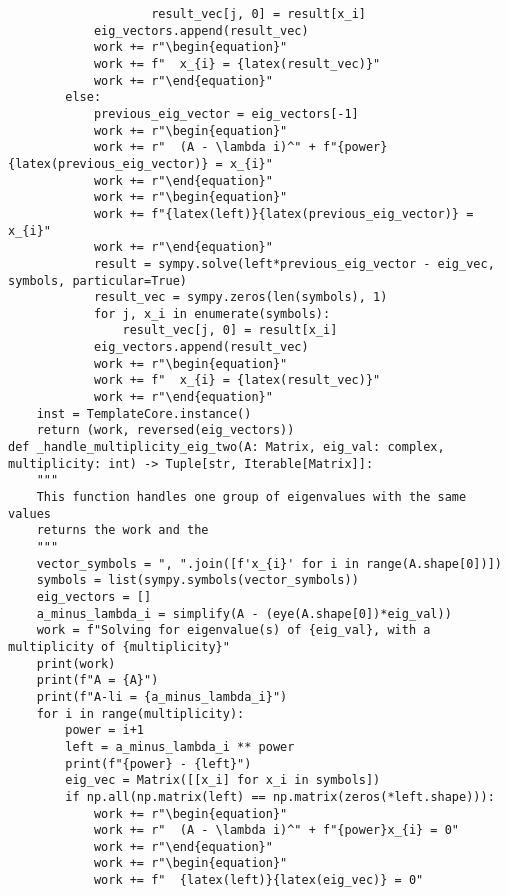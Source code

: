 \begin{verbatim}
                    result_vec[j, 0] = result[x_i]
            eig_vectors.append(result_vec)
            work += r"\begin{equation}"
            work += f"  x_{i} = {latex(result_vec)}"
            work += r"\end{equation}"
        else:
            previous_eig_vector = eig_vectors[-1]
            work += r"\begin{equation}"
            work += r"  (A - \lambda i)^" + f"{power}{latex(previous_eig_vector)} = x_{i}"
            work += r"\end{equation}"
            work += r"\begin{equation}"
            work += f"{latex(left)}{latex(previous_eig_vector)} = x_{i}"
            work += r"\end{equation}"
            result = sympy.solve(left*previous_eig_vector - eig_vec, symbols, particular=True)
            result_vec = sympy.zeros(len(symbols), 1)
            for j, x_i in enumerate(symbols):
                result_vec[j, 0] = result[x_i]
            eig_vectors.append(result_vec)
            work += r"\begin{equation}"
            work += f"  x_{i} = {latex(result_vec)}"
            work += r"\end{equation}"
    inst = TemplateCore.instance()
    return (work, reversed(eig_vectors))
def _handle_multiplicity_eig_two(A: Matrix, eig_val: complex, multiplicity: int) -> Tuple[str, Iterable[Matrix]]:
    """
    This function handles one group of eigenvalues with the same values
    returns the work and the 
    """
    vector_symbols = ", ".join([f'x_{i}' for i in range(A.shape[0])])
    symbols = list(sympy.symbols(vector_symbols))
    eig_vectors = []
    a_minus_lambda_i = simplify(A - (eye(A.shape[0])*eig_val))
    work = f"Solving for eigenvalue(s) of {eig_val}, with a multiplicity of {multiplicity}"
    print(work)
    print(f"A = {A}")
    print(f"A-li = {a_minus_lambda_i}")
    for i in range(multiplicity):
        power = i+1
        left = a_minus_lambda_i ** power
        print(f"{power} - {left}")
        eig_vec = Matrix([[x_i] for x_i in symbols])
        if np.all(np.matrix(left) == np.matrix(zeros(*left.shape))):
            work += r"\begin{equation}"
            work += r"  (A - \lambda i)^" + f"{power}x_{i} = 0"
            work += r"\end{equation}"
            work += r"\begin{equation}"
            work += f"  {latex(left)}{latex(eig_vec)} = 0"

\end{verbatim}
